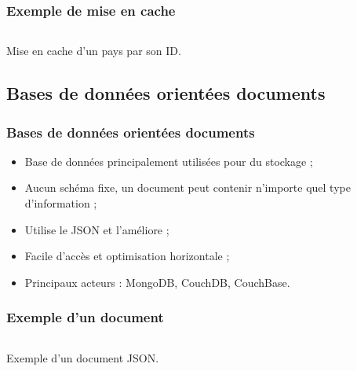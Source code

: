 	\begin{frame}
		\frametitle{Exemple de mise en cache}

		\begin{listing}[H]
			\inputminted[fontsize=\tiny, linenos=true]{php}{code/cacheRepository.php}
			\caption{Mise en cache d'un pays par son ID.}
		\end{listing}

	\end{frame}

	\subsection{Bases de données orientées documents}
	\begin{frame}
		\frametitle{Bases de données orientées documents}

		\begin{itemize}
			\item Base de données principalement utilisées pour du stockage ;
			\item Aucun schéma fixe, un document peut contenir n'importe quel type d'information ;
			\item Utilise le JSON et l'améliore ;
			\item Facile d'accès et optimisation horizontale ;
			\item Principaux acteurs : MongoDB, CouchDB, CouchBase.
		\end{itemize}

	\end{frame}

	\begin{frame}
		\frametitle{Exemple d'un document}

		\begin{listing}[H]
			\inputminted[fontsize=\tiny, linenos=true]{json}{code/exemple-document.json}
			\caption{Exemple d'un document JSON.}
		\end{listing}


	\end{frame}